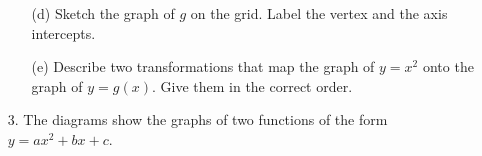 \documentclass[12pt, twoside]{article}
\begin{document}
\begin{enumerate}[itemsep=0.15cm]
\noindent
\begin{minipage}[t]{0.45\linewidth}
\vspace{0pt}
\begin{enumerate}[itemsep=0.1cm]
  \item[(d)] Sketch the graph of $g$ on the grid. Label the vertex and the
  axis intercepts.
\end{enumerate}
\end{minipage}%
\begin{minipage}[t]{0.55\linewidth}
\vspace{0pt}
\begin{flushright}
\end{flushright}
\end{minipage}

\newpage

\begin{enumerate}[itemsep=0.1cm]
  \item[(e)] Describe two transformations that map the graph of $y = x^{2}$
  onto the graph of $y = g(x)$. Give them in the correct order. \vfill
\end{enumerate}


\item[3.]
The diagrams show the graphs of two functions of the form
$y = ax^{2} + bx + c$.


\end{enumerate}
\end{document}
